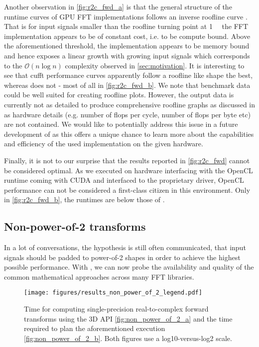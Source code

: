 Another observation in \cref{fig:r2c_fwd_a} is that the general structure of the runtime curves of GPU FFT implementations follows an inverse roofline curve \cite{williams2009roofline}. That is for input signals smaller than the roofline turning point at \SI{1}{\mebi\byte} the FFT implementation appears to be of constant cost, i.e. to be compute bound. Above the aforementioned threshold, the implementation appears to be memory bound and hence exposes a linear growth with growing input signals which corresponds to the $\mathcal{O}(n \log n)$ complexity observed in \cref{sec:motivation}. It is interesting to see that cufft performance curves apparently follow a roofline like shape the best, whereas \fftw{} does not - most of all in \cref{fig:r2c_fwd_b}.  We note that \gearshifft{} benchmark data could be well suited for creating roofline plots. However, the output data is currently not as detailed to produce comprehensive roofline graphs as discussed in \cite{ofenbeck2014applying} as hardware details (e.g. number of flops per cycle, number of flops per byte etc) are not contained. We would like to potentially address this issue in a future development of \gearshifft{} as this offers a unique chance to learn more about the capabilities and efficiency of the used implementation on the given hardware. 
 
Finally, it is not to our surprise that the \clfft{} results reported in \cref{fig:r2c_fwd} cannot be considered optimal. As we executed \clfft{} on \nvidia{} hardware interfacing with the OpenCL runtime coming with CUDA and interfaced to the \nvidia{} proprietary driver, OpenCL performance can not be considered a first-class citizen in this environment. Only in \cref{fig:r2c_fwd_b}, the \clfft{} runtimes are below those of \fftw{}.
 
\subsection{Non-power-of-2 transforms}
\label{ssec:nonpowerof2}

In a lot of conversations, the hypothesis is still often communicated, that input signals should be padded to power-of-2 shapes in order to achieve the highest possible performance. With \gearshifft{}, we can now probe the availability and quality of the common mathematical approaches across many FFT libraries. 

\begin{figure}[!tbp]
  \centering
  \texttt{[image: figures/results\_non\_power\_of\_2\_legend.pdf]}\vspace{-1em}
  \hfill
  \caption{Time for computing single-precision real-to-complex forward transforms using the 3D API \cref{fig:non_power_of_2_a} and the time required to plan the aforementioned execution \cref{fig:non_power_of_2_b}. Both figures use a log10-versus-log2 scale.}
  \label{fig:non_power_of_2}
\end{figure}

